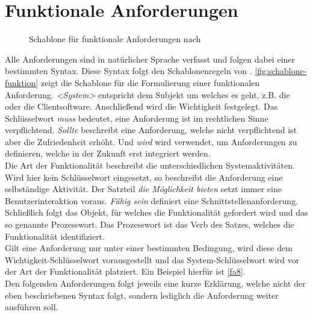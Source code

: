 \section{Funktionale Anforderungen}
\label{sec:funktionale}

\begin{figure}
    \centering
    
    \caption{Schablone für funktionale Anforderungen nach }
    \label{fig:schablone-funktion}
\end{figure}

Alle Anforderungen sind in natürlicher Sprache verfasst und folgen dabei einer bestimmten Syntax. Diese
Syntax folgt den Schablonenregeln von . \autoref{fig:schablone-funktion} zeigt die
Schablone für die Formulierung einer funktionalen Anforderung. \emph{<System>} entspricht dem 
Subjekt um welches
es geht, z.B. die \shst{} oder die Clientsoftware. Anschließend wird die Wichtigkeit festgelegt. Das 
Schlüsselwort \emph{muss} bedeutet, eine Anforderung ist im rechtlichen Sinne verpflichtend. \emph{Sollte} 
beschreibt eine Anforderung, welche nicht verpflichtend ist aber die Zufriedenheit erhöht. Und \emph{wird}
wird verwendet, um Anforderungen zu definieren, welche in der Zukunft erst integriert werden.\\
Die Art der Funktionalität beschreibt die unterschiedlichen Systemaktivitäten. Wird hier kein Schlüsselwort
eingesetzt, so beschreibt die Anforderung eine selbständige Aktivität. Der Satzteil \emph{die Möglichkeit bieten}
setzt immer eine Benutzerinteraktion voraus. \emph{Fähig sein} definiert eine Schnittstellenanforderung.\\
Schließlich folgt das Objekt, für welches die Funktionalität gefordert wird und das so genannte Prozesswort. Das
Prozesswort ist das Verb des Satzes, welches die Funktionalität identifiziert.\\
Gilt eine Anforderung nur unter einer bestimmten Bedingung, wird diese dem Wichtigkeit-Schlüsselwort vorausgestellt und
das System-Schlüsselwort wird vor der Art der Funktionalität platziert. Ein Beispiel hierfür ist \ref{fa8}.\\

Den folgenden Anforderungen folgt jeweils eine kurze Erklärung, welche nicht der eben beschriebenen Syntax folgt,
sondern lediglich die Anforderung weiter ausführen soll. 

